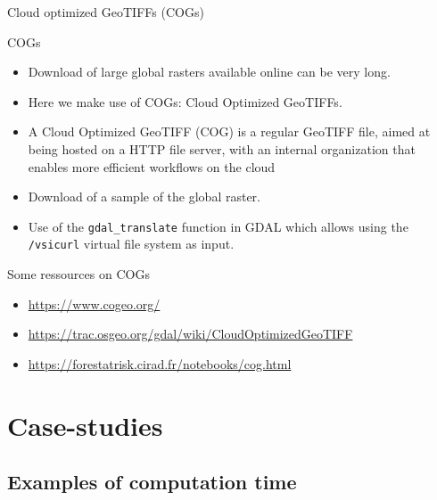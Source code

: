 \documentclass[10pt,table,dvipsnames,compress]{beamer}
\begin{document}
\begin{frame}[label={sec:orgbd6eb91},fragile]{Cloud optimized GeoTIFFs (COGs)}
 \begin{block}{COGs}
\begin{itemize}
\item Download of large global rasters available online can be very long.
\item Here we make use of COGs: Cloud Optimized GeoTIFFs.
\item A Cloud Optimized GeoTIFF (COG) is a regular GeoTIFF file, aimed at being hosted on a HTTP file server, with an internal organization that enables more efficient workflows on the cloud
\item Download of a sample of the global raster.
\item Use of the \texttt{gdal\_translate} function in GDAL which allows using the \texttt{/vsicurl} virtual file system as input.
\end{itemize}
\end{block}

\begin{block}{Some ressources on COGs}
\begin{itemize}
\item \url{https://www.cogeo.org/}
\item \url{https://trac.osgeo.org/gdal/wiki/CloudOptimizedGeoTIFF}
\item \url{https://forestatrisk.cirad.fr/notebooks/cog.html}
\end{itemize}
\end{block}
\end{frame}


\section{Case-studies}
\label{sec:org4c880da}

\subsection{Examples of computation time}
\label{sec:org22e24ea}
\end{document}

